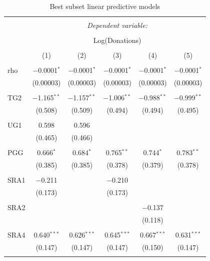 \documentclass[12pt]{article}
\begin{document}
\begin{table}[!htbp] \centering 
  \caption{Best subset linear predictive models} 
  \label{} 
    \begin{adjustbox}{width=\textwidth}
\begin{tabular}{@{\extracolsep{5pt}}lccccc} 
\\[-1.8ex]\hline 
\hline \\[-1.8ex] 
 & \multicolumn{5}{c}{\textit{Dependent variable:}} \\ 
\cline{2-6} 
\\[-1.8ex] & \multicolumn{5}{c}{Log(Donations)} \\ 
\\[-1.8ex] & (1) & (2) & (3) & (4) & (5)\\ 
\hline \\[-1.8ex] 
 rho & $-$0.0001$^{*}$ & $-$0.0001$^{*}$ & $-$0.0001$^{*}$ & $-$0.0001$^{*}$ & $-$0.0001$^{*}$ \\ 
  & (0.00003) & (0.00003) & (0.00003) & (0.00003) & (0.00003) \\ 
  & & & & & \\ 
 TG2 & $-$1.165$^{**}$ & $-$1.157$^{**}$ & $-$1.006$^{**}$ & $-$0.988$^{**}$ & $-$0.999$^{**}$ \\ 
  & (0.508) & (0.509) & (0.494) & (0.494) & (0.495) \\ 
  & & & & & \\ 
 UG1 & 0.598 & 0.596 &  &  &  \\ 
  & (0.465) & (0.466) &  &  &  \\ 
  & & & & & \\ 
 PGG & 0.666$^{*}$ & 0.684$^{*}$ & 0.765$^{**}$ & 0.744$^{*}$ & 0.783$^{**}$ \\ 
  & (0.385) & (0.385) & (0.378) & (0.379) & (0.378) \\ 
  & & & & & \\ 
 SRA1 & $-$0.211 &  & $-$0.210 &  &  \\ 
  & (0.173) &  & (0.173) &  &  \\ 
  & & & & & \\ 
 SRA2 &  &  &  & $-$0.137 &  \\ 
  &  &  &  & (0.118) &  \\ 
  & & & & & \\ 
 SRA4 & 0.640$^{***}$ & 0.626$^{***}$ & 0.645$^{***}$ & 0.667$^{***}$ & 0.631$^{***}$ \\ 
  & (0.147) & (0.147) & (0.147) & (0.150) & (0.147) \\ 
  & & & & & \\ 

\end{tabular}
\end{adjustbox}
\end{table}
\end{document}
